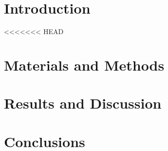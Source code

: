 \documentclass{bmcart}
\begin{document}


\section*{Introduction}



<<<<<<< HEAD
\section*{Materials and Methods}



\section*{Results and Discussion}



\section*{Conclusions}


\end{document}
